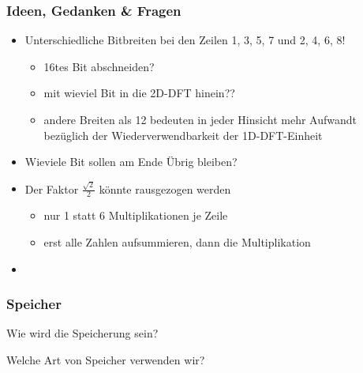 \begin{frame}\frametitle{Ideen, Gedanken \& Fragen}
\begin{itemize}
 \item Unterschiedliche Bitbreiten bei den Zeilen 1, 3, 5, 7 und 2, 4, 6, 8!
 \begin{itemize}
  \item 16tes Bit abschneiden?
  \item mit wieviel Bit in die 2D-DFT hinein??
  \item andere Breiten als 12 bedeuten in jeder Hinsicht mehr Aufwandt bezüglich der Wiederverwendbarkeit der 1D-DFT-Einheit
 \end{itemize}

 \item Wieviele Bit sollen am Ende Übrig bleiben?

 \item Der Faktor $\frac{\sqrt{2}}{2}$ könnte rausgezogen werden 
 \begin{itemize}
  \item nur 1 statt 6 Multiplikationen je Zeile
  \item erst alle Zahlen aufsummieren, dann die Multiplikation
 \end{itemize}

 \item
\end{itemize}


 
\end{frame}


\begin{frame}\frametitle{Speicher}
 Wie wird die Speicherung sein?
 
 Welche Art von Speicher verwenden wir?
\end{frame}



